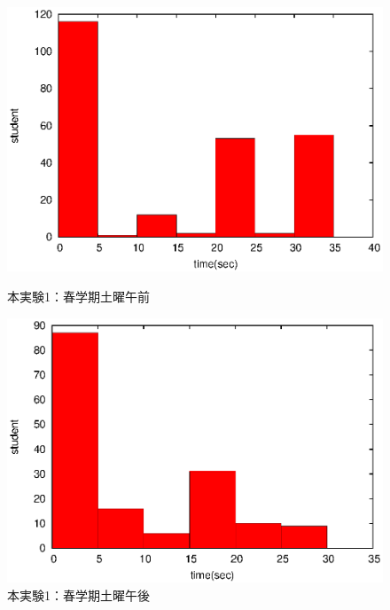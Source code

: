 \documentclass[a4paper,10pt]{jarticle}
\begin{document}
\begin{figure}[htpb]                        
\begin{minipage} {0.5\hsize}                             
\begin{center}                              
\includegraphics[bb=0 0 390 248,clip,width=\hsize]{oSa12_hist.eps}   
\caption{本実験1：春学期土曜午前}                              
\label{oSa12}                                
\end{center}                                    
\end{minipage}                                 
\begin{minipage}{0.5\hsize}                                            
\begin{center}                              
\includegraphics[bb=0 0 390 248,clip,width=\hsize]{oSa345_hist.eps}   
\caption{本実験1：春学期土曜午後}                              
\label{oSa345}                                
\end{center}                                    
\end{minipage}                                 
\end{figure}                                 


\end{document}
